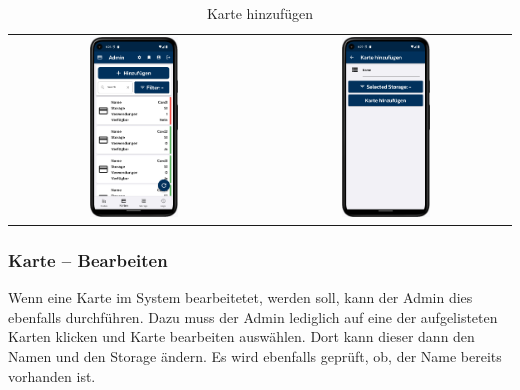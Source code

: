 \vspace{1cm}
\begin{table}[htbp]
  \centering
  \begin{tabular}{cc}
    \includegraphics[width=0.37\textwidth]{FLUTTER/images/ZB/card_page.png} &
    \includegraphics[width=0.37\textwidth]{FLUTTER/images/ZB/card_add_page.png} \\
  \end{tabular}
  \label{tab:example}
  \captionsetup{type=figure}
  \caption{Karte hinzufügen}
\end{table}

\newpage

\subsubsection{Karte – Bearbeiten} \label{subsubsec:alterCard}
Wenn eine Karte im System bearbeitetet, werden soll, kann der Admin dies ebenfalls durchführen. Dazu muss der Admin lediglich auf eine der aufgelisteten Karten klicken und Karte bearbeiten auswählen. Dort kann dieser dann den Namen und den Storage ändern. Es wird ebenfalls geprüft, ob, der Name bereits vorhanden ist.

